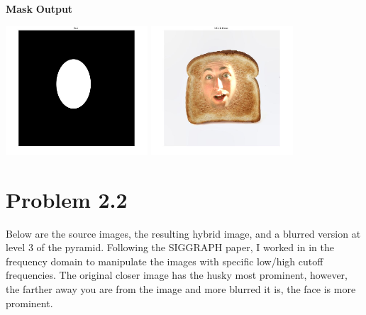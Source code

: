 \documentclass[12pt,twoside]{article}
\newcommand{\tabUnit}{3ex}
\newcommand{\tabT}{\hspace*{\tabUnit}}
\begin{document}
\tabT\tabT\tabT\tabT\tabT\tabT\tabT\tabT\tabT \textbf{Mask}
\tabT\tabT\tabT\tabT\tabT\tabT\tabT \textbf{Output}

\tabT\tabT\tabT\tabT\tabT
\includegraphics[width = 150pt]{lmask}
\includegraphics[width = 150pt]{lblended_image}


\section*{Problem 2.2}
\tabT Below are the source images, the resulting hybrid image, and a blurred version at level 3 of the pyramid.  Following the SIGGRAPH paper, I worked in in the frequency domain to manipulate the images with specific low/high cutoff frequencies.  The original closer image has the husky most prominent, however, the farther away you are from the image and more blurred it is, the face is more prominent.
\newline
\end{document}
